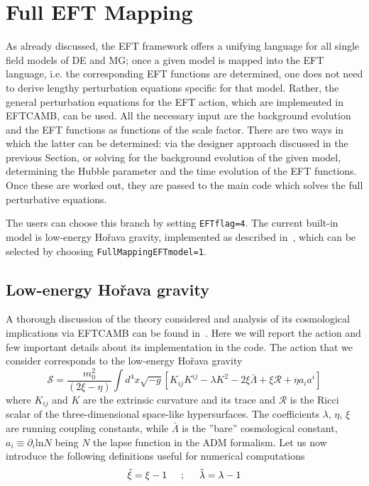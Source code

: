\documentclass[prd,nofootinbib,showpacs]{revtex4}
\def\be{\begin{equation}}
\def\ee{\end{equation}}
\def\f{\frac}
\begin{document}
{\section{Full EFT Mapping}\label{Fullmapping}

As already discussed, the EFT framework offers a unifying language for all single field models of DE and MG; once a given model is mapped into the EFT language, i.e. the corresponding EFT functions are determined, one does not need to derive  lengthy  perturbation equations specific for that model. Rather, the general perturbation equations for the EFT action, which are implemented in EFTCAMB, can be used. All the necessary input are the background evolution and the EFT functions as functions of the scale factor. There are two ways in which the latter can be determined: via the designer approach discussed in the previous Section, or solving for the background evolution of the given model, determining the Hubble parameter and  the time evolution of the EFT functions. Once these are worked out, they are passed to the main code  which solves  the full perturbative equations.

The users can choose this branch by setting \verb|EFTflag=4|. The current built-in model is low-energy Ho\v rava gravity, implemented as described in~\cite{Frusciante:2015maa}, which can be selected by choosing \verb|FullMappingEFTmodel=1|.

\subsection{Low-energy Ho\v rava gravity}\label{Horava}

A thorough discussion of the theory considered and  analysis of its cosmological implications via EFTCAMB can be found in~\cite{Frusciante:2015maa}. Here we will report the action and few important details about its implementation in the code. The action that we consider corresponds to  the low-energy Ho\v rava gravity~\cite{Blas:2009qj}
\be\label{Horavaaction}
\mathcal{S}=\f{m_0^2}{(2\xi-\eta)}\int{}d^4x\sqrt{-g}\left[K_{ij}K^{ij}-\lambda K^2 -2 \xi\bar{\Lambda}+\xi \mathcal{R}+\eta a_i a^i\right]
\ee
where $K_{ij}$ and $K$ are the extrinsic curvature and its trace and $\mathcal{R}$ is the  Ricci scalar of the three-dimensional space-like hypersurfaces. The coefficients $\lambda$, $\eta$, $\xi$  are running coupling constants, while $\bar{\Lambda}$ is the ''bare'' cosmological constant,  $a_i \equiv \partial_i \mbox{ln} N$ being $N$ the lapse function in the ADM formalism. 
Let us now introduce the following definitions useful for numerical computations
\begin{align}
\tilde{\xi} = \xi - 1  \hspace{0.5cm};\hspace{0.5cm} \tilde{\lambda} = \lambda -1   
\label{redef}
\end{align}

}
\end{document}
